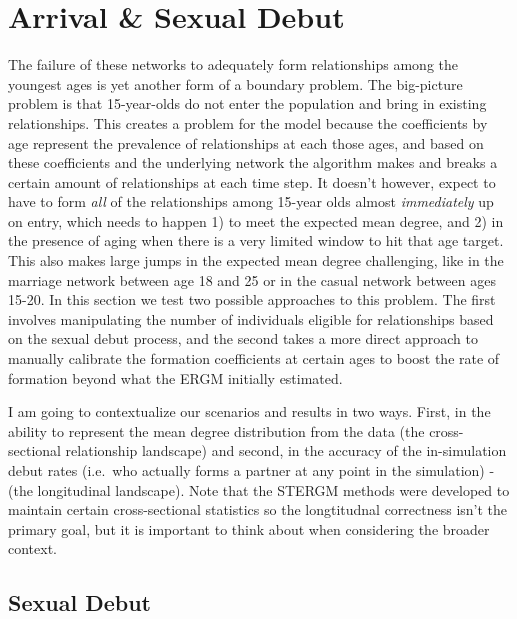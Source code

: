 \documentclass [11pt, proquest] {uwthesis}[2015/03/03]
\begin{document}
\section{Arrival \& Sexual Debut}\label{arrival-sexual-debut}

The failure of these networks to adequately form relationships among the
youngest ages is yet another form of a boundary problem. The big-picture
problem is that 15-year-olds do not enter the population and bring in
existing relationships. This creates a problem for the model because the
coefficients by age represent the prevalence of relationships at each
those ages, and based on these coefficients and the underlying network
the algorithm makes and breaks a certain amount of relationships at each
time step. It doesn't however, expect to have to form \emph{all} of the
relationships among 15-year olds almost \emph{immediately} up on entry,
which needs to happen 1) to meet the expected mean degree, and 2) in the
presence of aging when there is a very limited window to hit that age
target. This also makes large jumps in the expected mean degree
challenging, like in the marriage network between age 18 and 25 or in
the casual network between ages 15-20. In this section we test two
possible approaches to this problem. The first involves manipulating the
number of individuals eligible for relationships based on the sexual
debut process, and the second takes a more direct approach to manually
calibrate the formation coefficients at certain ages to boost the rate
of formation beyond what the ERGM initially estimated.

I am going to contextualize our scenarios and results in two ways.
First, in the ability to represent the mean degree distribution from the
data (the cross-sectional relationship landscape) and second, in the
accuracy of the in-simulation debut rates (i.e.~who actually forms a
partner at any point in the simulation) - (the longitudinal landscape).
Note that the STERGM methods were developed to maintain certain
cross-sectional statistics so the longtitudnal correctness isn't the
primary goal, but it is important to think about when considering the
broader context.

\subsection{Sexual Debut}\label{sexual-debut}
\end{document}
